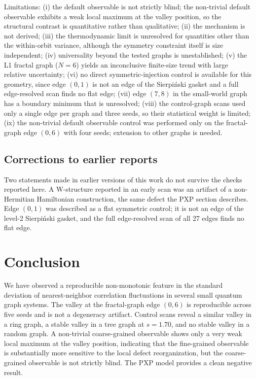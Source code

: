 \documentclass[pdflatex,sn-mathphys-num,iicol]{sn-jnl}
\begin{document}
Limitations: (i) the default observable is not strictly blind; the non-trivial default observable exhibits a weak local maximum at the valley position, so the structural contrast is quantitative rather than qualitative; (ii) the mechanism is not derived; (iii) the thermodynamic limit is unresolved for quantities other than the within-orbit variance, although the symmetry constraint itself is size independent; (iv) universality beyond the tested graphs is unestablished; (v) the L1 fractal graph ($N=6$) yields an inconclusive finite-size trend with large relative uncertainty; (vi) no direct symmetric-injection control is available for this geometry, since edge $(0,1)$ is not an edge of the Sierpi\'{n}ski gasket and a full edge-resolved scan finds no flat edge; (vii) edge $(7,8)$ in the small-world graph has a boundary minimum that is unresolved; (viii) the control-graph scans used only a single edge per graph and three seeds, so their statistical weight is limited; (ix) the non-trivial default observable control was performed only on the fractal-graph edge $(0,6)$ with four seeds; extension to other graphs is needed.

\subsection*{Corrections to earlier reports}

Two statements made in earlier versions of this work do not survive the checks reported here. A W-structure reported in an early scan was an artifact of a non-Hermitian Hamiltonian construction, the same defect the PXP section describes. Edge $(0,1)$ was described as a flat symmetric control; it is not an edge of the level-2 Sierpi\'{n}ski gasket, and the full edge-resolved scan of all 27 edges finds no flat edge.

\section{Conclusion}

We have observed a reproducible non-monotonic feature in the standard deviation of nearest-neighbor correlation fluctuations in several small quantum graph systems. The valley at the fractal-graph edge $(0,6)$ is reproducible across five seeds and is not a degeneracy artifact. Control scans reveal a similar valley in a ring graph, a stable valley in a tree graph at $s=1.70$, and no stable valley in a random graph. A non-trivial coarse-grained observable shows only a very weak local maximum at the valley position, indicating that the fine-grained observable is substantially more sensitive to the local defect reorganization, but the coarse-grained observable is not strictly blind. The PXP model provides a clean negative result.
\end{document}
